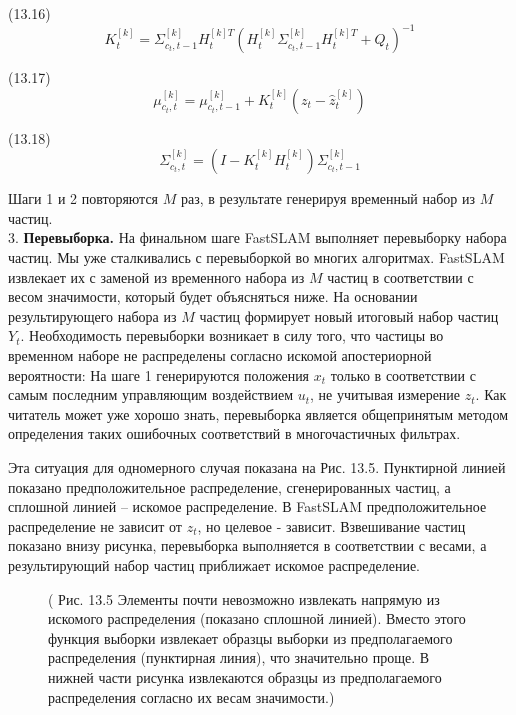 \documentclass[10pt,a4paper]{article}
\begin{document}
(13.16)
$$K_t^{[k]}=\varSigma_{c_t,t-1}^{[k]}H_t^{[k]T}(H_t^{[k]}\varSigma_{c_t,t-1}^{[k]}H_t^{[k]T}+Q_t)^{-1}$$

(13.17)
$$\mu_{c_t,t}^{[k]}=\mu_{c_t,t-1}^{[k]}+K_t^{[k]}(z_t-\hat{z}_t^{[k]})$$

(13.18)
$$\varSigma_{c_t,t}^{[k]}=(I-K_t^{[k]}H_t^{[k]})\varSigma_{c_t,t-1}^{[k]}$$

Шаги 1 и 2 повторяются $M$ раз, в результате генерируя временный набор из $M$ частиц.\\

3.	\textbf{Перевыборка.} На финальном шаге FastSLAM выполняет перевыборку набора частиц. Мы уже сталкивались с перевыборкой во многих алгоритмах. FastSLAM извлекает их с заменой из временного набора из $M$ частиц в соответствии с весом значимости, который будет объясняться ниже. На основании результирующего набора из $M$ частиц формирует новый итоговый набор частиц $Y_t$. Необходимость перевыборки возникает в силу того, что частицы во временном наборе не распределены согласно искомой апостериорной вероятности: На шаге 1 генерируются положения $x_t$ только в соответствии с самым последним управляющим воздействием $u_t$, не учитывая измерение $z_t$. Как читатель может уже хорошо знать, перевыборка является общепринятым методом определения таких ошибочных соответствий в многочастичных фильтрах.

Эта ситуация для одномерного случая показана на Рис. 13.5. Пунктирной линией показано предположительное распределение, сгенерированных частиц, а сплошной линией – искомое распределение. В FastSLAM предположительное распределение не зависит от $z_t$, но целевое - зависит. Взвешивание частиц показано внизу рисунка, перевыборка выполняется в соответствии с весами, а результирующий набор частиц приближает искомое распределение.

\begin{figure}[H]
	\caption{ ( Рис. 13.5 Элементы почти невозможно извлекать напрямую из искомого распределения (показано сплошной линией). Вместо этого функция выборки извлекает образцы выборки из предполагаемого распределения (пунктирная линия), что значительно проще. В нижней части рисунка извлекаются образцы из предполагаемого распределения согласно их весам значимости.) }
	\label{fig:135orig}
\end{figure}
\end{document}

